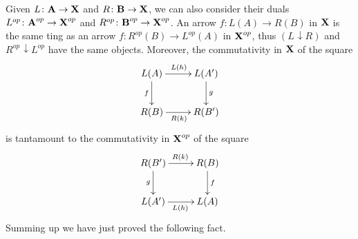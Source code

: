 \documentclass[a4paper,UKenglish,cleveref,pdftex,thm-restate,numberwithinsect]{lipics-v2021}
\def\B{\textbf {\textup{B}}}
\def\X{\textbf {\textup{X}}}
\def\A{\textbf {\textup{A}}}
\newcommand{\comma}[2]{#1\hspace{1pt} {\downarrow}#2}
\begin{document}
Given $L\colon \A\to \X$ and $R\colon \B\to \X$, we can also consider their duals $L^{op}\colon \A^{op}\to \X^{op}$ and $R^{op}\colon \B^{op}\to \X^{op}$.  An arrow $f\colon L(A)\to R(B)$ in $\X$ is the same ting as an arrow $f\colon R^{op}(B)\to L^{op}(A)$ in $\X^{op}$, thus $\left(\comma{L}{R}\right)$ and $\comma{R^{op}}{L^{op}}$ have the same objects. Moreover, the commutativity in  $\X$ of the square
\[\xymatrix@C=25pt{L(A) \ar[r]^{L(h)} \ar[d]_{f} & L(A') \ar[d]^{g}\\ R(B) \ar[r]_{R(k)}& R(B')}\]
is tantamount to the commutativity in $\X^{op}$ of the square 
\[\xymatrix@C=25pt{ R(B') \ar[d]_{g} \ar[r]^{R(k)}& R(B) \ar[d]^{f}\\ L(A') \ar[r]_{L(h)}  & L(A) }\]
Summing up we have just proved the following fact.
\end{document}
